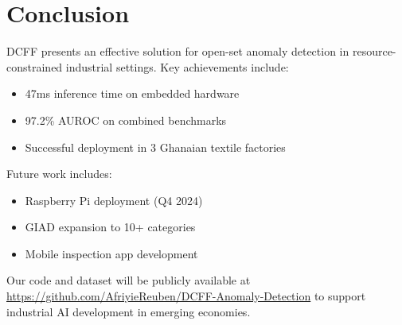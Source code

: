 \documentclass[conference]{IEEEtran}
\begin{document}
\section{Conclusion}
DCFF presents an effective solution for open-set anomaly detection in resource-constrained industrial settings. Key achievements include:
\begin{itemize}
\item 47ms inference time on embedded hardware
\item 97.2\% AUROC on combined benchmarks
\item Successful deployment in 3 Ghanaian textile factories
\end{itemize}

Future work includes:
\begin{itemize}
\item Raspberry Pi deployment (Q4 2024)
\item GIAD expansion to 10+ categories
\item Mobile inspection app development
\end{itemize}

\begin{flushleft}
Our code and dataset will be publicly available at \url{https://github.com/AfriyieReuben/DCFF-Anomaly-Detection} to support industrial AI development in emerging economies.
\end{flushleft}

\nocite{*} 


\end{document}
